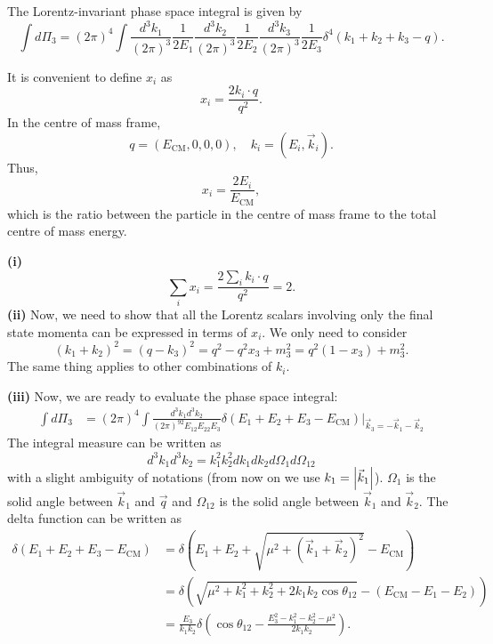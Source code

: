 \documentclass[11pt]{article}
\theoremstyle{definition}
\begin{document}
The Lorentz-invariant phase space integral is given by
\begin{equation}
    \int d\Pi_3 = (2\pi)^4\int \frac{d^3k_1}{(2\pi)^3}\frac{1}{2E_1}\frac{d^3k_2}{(2\pi)^3}\frac{1}{2E_2}\frac{d^3k_3}{(2\pi)^3}\frac{1}{2E_3}\delta^4(k_1+k_2+k_3-q).
\end{equation}

It is convenient to define $x_i$ as
\begin{equation}
    x_i = \frac{2k_i\cdot q}{q^2}.
\end{equation}
In the centre of mass frame,
\begin{equation}
    q = (E_\text{CM},0,0,0), \quad k_i = (E_i, \vec{k}_i).
\end{equation}
Thus, 
\begin{equation}
    x_i = \frac{2E_i}{E_\text{CM}},
\end{equation}
which is the ratio between the particle in the centre of mass frame to the total centre of mass energy.

\textbf{(i)} 
\begin{equation}
    \sum_ix_i = \frac{2\sum_ik_i\cdot q}{q^2} = 2.
\end{equation}
\textbf{(ii)} Now, we need to show that all the Lorentz scalars involving only the final state momenta can be expressed in terms of $x_i$. We only need to consider
\begin{equation}
    (k_1+k_2)^2 = (q-k_3)^2 = q^2 - q^2x_3 + m_3^2 =q^2(1-x_3) + m_3^2.
\end{equation}
The same thing applies to other combinations of $k_i$.

\textbf{(iii)} Now, we are ready to evaluate the phase space integral:
\begin{equation}
    \begin{aligned}
        \int d\Pi_3&= (2\pi)^4\int\frac{d^3k_1d^3k_2}{(2\pi)^92E_12E_22E_3}\delta(E_1+E_2+E_3-E_\text{CM})\bigg|_{\vec{k}_3 = -\vec{k}_1-\vec{k}_2}
    \end{aligned}
\end{equation}
The integral measure can be written as 
\begin{equation}
    d^3k_1d^3k_2 = k_1^2k_2^2dk_1dk_2d\Omega_1d\Omega_{12}
\end{equation}
with a slight ambiguity of notations (from now on we use $k_1=\abs{\vec{k}_1}$). $\Omega_1$ is the solid angle between $\vec{k}_1$ and $\vec{q}$ and $\Omega_{12}$ is the solid angle between $\vec{k}_1$ and $\vec{k}_2$. The delta function can be written as 
\begin{equation}
\begin{aligned}
    \delta(E_1+E_2+E_3-E_\text{CM}) &= \delta\left(E_1+E_2+\sqrt{\mu^2+(\vec{k}_1+\vec{k}_2)^2}-E_\text{CM}\right)\\
    &= \delta\left(\sqrt{\mu^2+k_1^2+k_2^2+2k_1k_2\cos\theta_{12}}-(E_\text{CM}-E_1-E_2)\right)\\
    &= \frac{E_3}{k_1k_2} \delta\left( \cos\theta_{12} - \frac{E_3^2-k_1^2-k_2^2-\mu^2}{2k_1k_2} \right).
\end{aligned}
\end{equation}
\end{document}
